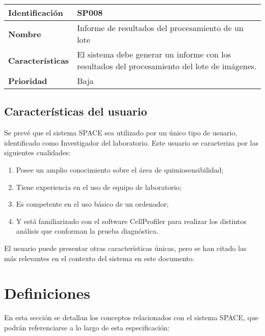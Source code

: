 \documentclass{scrreprt}
\begin{document}
\vspace{0.8cm}

\begin{tabular}{ |p{3cm}|p{10cm}|  }
  \hline
  \textbf{Identificación} & SP008 \\
  \hline
  \textbf{Nombre} & Informe de resultados del procesamiento de un lote\\
  \hline
  \textbf{Características} & El sistema debe generar un informe con los resultados del procesamiento del lote de imágenes.\\
  \hline
  \textbf{Prioridad} & Baja \\
  \hline
\end{tabular}

\vspace{0.8cm}


\subsection{Características del usuario}

Se prevé que el sistema SPACE sea utilizado por un único tipo de usuario, identificado como Investigador del laboratorio. Este usuario se caracteriza por las siguientes cualidades:
\begin{enumerate}[label=\alph*.]
\item Posee un amplio conocimiento sobre el área de quimiosensibilidad;
\item Tiene experiencia en el uso de equipo de laboratorio; 
\item Es competente en el uso básico de un ordenador;
\item Y está familiarizado con el software CellProfiler para realizar los distintos análisis que conforman la prueba diagnóstica.
\end{enumerate}

El usuario puede presentar otras características únicas, pero se han citado las más relevantes en el contexto del sistema en este documento.


\section{Definiciones}

En esta sección se detallan los conceptos relacionados con el sistema SPACE, que podrán referenciarse a lo largo de esta especificación:
\end{document}
